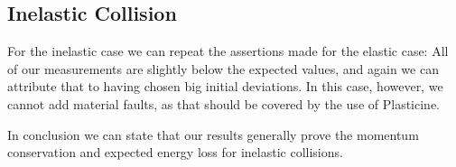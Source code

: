 \documentclass{scrreprt}
\begin{document}
\subsection{Inelastic Collision}

For the inelastic case we can repeat the assertions made for the elastic case: All of our measurements are slightly below the expected values, and again we can attribute that to having chosen big initial deviations. In this case, however, we cannot add material faults, as that should be covered by the use of Plasticine.\newline

In conclusion we can state that our results generally prove the momentum conservation and expected energy loss for inelastic collisions.\newline
 
\end{document}
